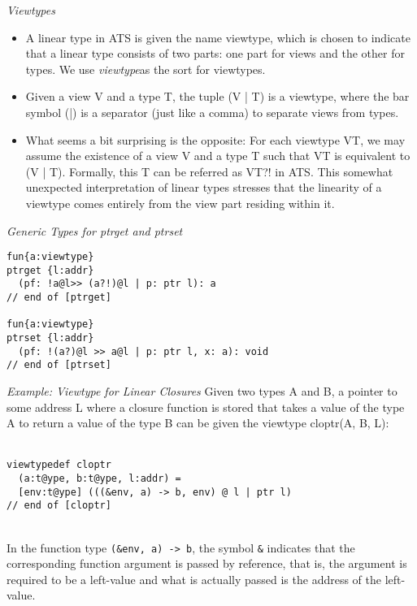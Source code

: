 \documentclass[pdf]{prosper}
\begin{document}
\def\VT{{\it VT}}
\def\sviewtype{{\it viewtype}}
\begin{slide}{\em Viewtypes}
\begin{itemize}
\item
A linear type in ATS is given the name viewtype, which is chosen to
indicate that a linear type consists of two parts: one part for views and
the other for types. We use \sviewtype as the sort for viewtypes.
\item Given a view V and a type T, the
tuple (V | T) is a viewtype, where the bar symbol (|) is a separator (just
like a comma) to separate views from types.
\item
What seems a bit surprising is the opposite: For each viewtype VT, we may
assume the existence of a view V and a type T such that VT is equivalent to
(V | T). Formally, this T can be referred as VT?! in ATS. This somewhat
unexpected interpretation of linear types stresses that the linearity of a
viewtype comes entirely from the view part residing within it.
\end{itemize}
\vfill
\end{slide}
\begin{slide}{\em Generic Types for {\it ptrget} and {\it ptrset}}
{\blue\begin{verbatim}
fun{a:viewtype}
ptrget {l:addr}
  (pf: !a@l>> (a?!)@l | p: ptr l): a
// end of [ptrget]

fun{a:viewtype}
ptrset {l:addr}
  (pf: !(a?)@l >> a@l | p: ptr l, x: a): void
// end of [ptrset]
\end{verbatim}
}
\end{slide}
\begin{slide}{\em Example: Viewtype for Linear Closures}
Given two types A and B, a pointer to some address L where a closure
function is stored that takes a value of the type A to return a value of
the type B can be given the viewtype cloptr(A, B, L): ~\\~\\
{\blue\begin{verbatim}
viewtypedef cloptr
  (a:t@ype, b:t@ype, l:addr) =
  [env:t@ype] (((&env, a) -> b, env) @ l | ptr l)
// end of [cloptr]
\end{verbatim}
}~\\
In the function type \verb`(&env, a) -> b`, the symbol \verb`&` indicates
that the corresponding function argument is passed by reference, that is,
the argument is required to be a left-value and what is actually passed is
the address of the left-value.
\end{slide}
\end{document}
